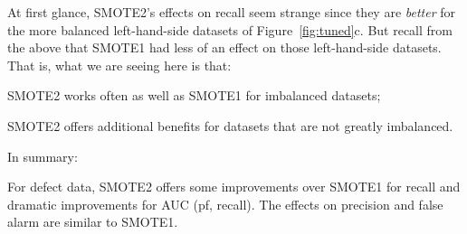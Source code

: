 At first glance, SMOTE2's effects on recall seem strange since they are
{\em better} for the more balanced left-hand-side datasets of
Figure~\ref{fig:tuned}c.  But recall from the above that SMOTE1 had less
of an effect on those left-hand-side datasets. That is, what we are seeing
here is that:
\bi
\item
SMOTE2 works often as well as SMOTE1 for imbalanced datasets;
\item
SMOTE2 offers additional benefits for datasets that are not greatly
imbalanced.
\ei




In summary:

\begin{lesson1}
    For defect data, SMOTE2  
 offers   some  improvements over SMOTE1 for recall
 and dramatic improvements for AUC (pf, recall).
 The effects on precision and false alarm are similar to SMOTE1.
\end{lesson1}

